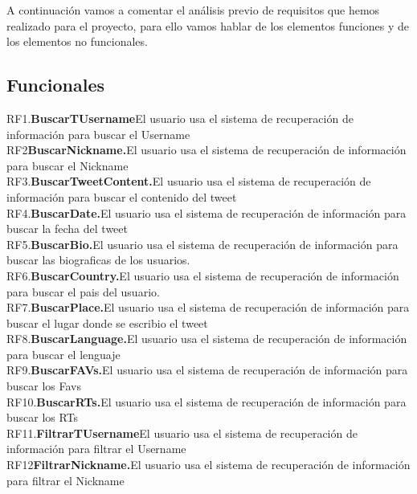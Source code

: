 A continuación vamos a comentar el análisis previo de requisitos que hemos realizado para el proyecto, para ello vamos hablar de los elementos funciones y de los elementos no funcionales.


\subsection{Funcionales}
RF1.\textbf{BuscarTUsername}El usuario usa el sistema de recuperación de información para buscar el Username\\

RF2\textbf{BuscarNickname.}El usuario usa el sistema de recuperación de información para buscar el Nickname \\

RF3.\textbf{BuscarTweetContent.}El usuario usa el sistema de recuperación de información para buscar el contenido del tweet\\

RF4.\textbf{BuscarDate.}El usuario usa el sistema de recuperación de información para buscar la fecha del tweet\\

RF5.\textbf{BuscarBio.}El usuario usa el sistema de recuperación de información para buscar las biograficas de los usuarios.\\

RF6.\textbf{BuscarCountry.}El usuario usa el sistema de recuperación de información para buscar el pais del usuario.\\

RF7.\textbf{BuscarPlace.}El usuario usa el sistema de recuperación de información para buscar el lugar donde se escribio el tweet\\

RF8.\textbf{BuscarLanguage.}El usuario usa el sistema de recuperación de información para buscar el lenguaje\\

RF9.\textbf{BuscarFAVs.}El usuario usa el sistema de recuperación de información para buscar los Favs\\

RF10.\textbf{BuscarRTs.}El usuario usa el sistema de recuperación de información para buscar los RTs\\

RF11.\textbf{FiltrarTUsername}El usuario usa el sistema de recuperación de información para filtrar el Username\\

RF12\textbf{FiltrarNickname.}El usuario usa el sistema de recuperación de información para filtrar el Nickname\\

